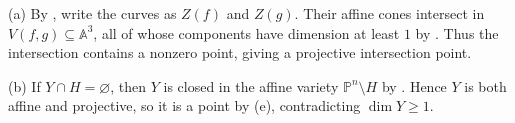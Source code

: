 (a) By , write the curves as $Z(f)$ and $Z(g)$. Their affine cones intersect in $V(f,g)\subseteq\mathbb A^3$, all of whose components have dimension at least $1$ by . Thus the intersection contains a nonzero point, giving a projective intersection point.

(b) If $Y\cap H=\varnothing$, then $Y$ is closed in the affine variety $\mathbb P^n\setminus H$ by . Hence $Y$ is both affine and projective, so it is a point by (e), contradicting $\dim Y\ge1$.

